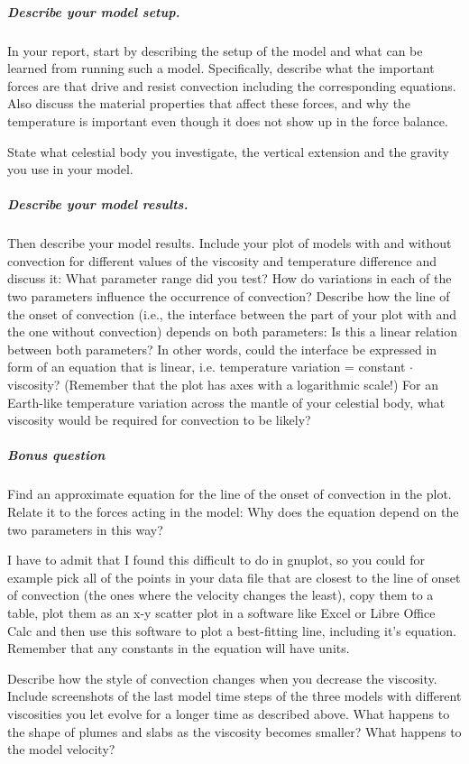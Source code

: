 \subparagraph{Describe your model setup.}
In your report, start by describing the setup of the model and what can be learned from running such a model. 
Specifically, describe what the important forces are that drive and resist convection including the corresponding equations. 
Also discuss the material properties that affect these forces, and why the temperature is important even though it does not show up in the force balance. 

State what celestial body you investigate, the vertical extension and the gravity you use in your model. 

\subparagraph{Describe your model results.}
Then describe your model results. Include your plot of models with and without convection for different values of the viscosity and temperature difference and discuss it:
What parameter range did you test?
How do variations in each of the two parameters influence the occurrence of convection? 
Describe how the line of the onset of convection (i.e., the interface between the part of your plot with and the one without convection)
depends on both parameters: Is this a linear relation between both parameters? In other words, could the interface be expressed in form of an equation that is linear, i.e. temperature variation = constant $\cdot$ viscosity? (Remember that the plot has axes with a logarithmic scale!)
For an Earth-like temperature variation across the mantle of your celestial body, what viscosity would be required for convection to be likely?

\subparagraph{Bonus question }
Find an approximate equation for the line of the onset of convection in the plot. 
Relate it to the forces acting in the model: Why does the equation depend on the two parameters in this way?

I have to admit that I found this difficult to do in gnuplot, so you could for example pick all of the points in your data file that are closest to the line of onset of convection (the ones where the velocity changes the least), copy them to a table, plot them as an x-y scatter plot in a software like Excel or Libre Office Calc and then use this software to plot a best-fitting line, including it's equation. 
Remember that any constants in the equation will have units. 

Describe how the style of convection changes when you decrease the viscosity. Include screenshots of the last model time steps of the three models with different viscosities you let evolve for a longer time as described above. What happens to the shape of plumes and slabs as the viscosity becomes smaller? What happens to the model velocity?

